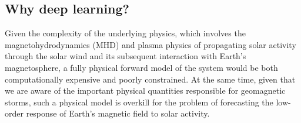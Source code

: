 \documentclass[draft,linenumbers]{agujournal2018}
\begin{document}

\subsection{Why deep learning?}
Given the complexity of the underlying physics, which involves the magnetohydrodynamics (MHD) and plasma physics of propagating solar activity through the solar wind and its subsequent interaction with Earth's magnetosphere, a fully physical forward model of the system would be both computationally expensive and poorly constrained. At the same time, given that we are aware of the important physical quantities responsible for geomagnetic storms, such a physical model is overkill for the problem of forecasting the low-order response of Earth's magnetic field to solar activity.
\end{document}
